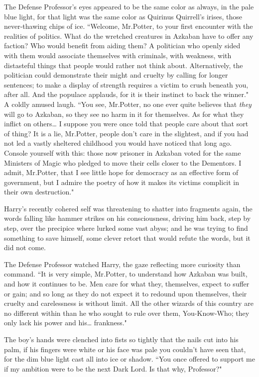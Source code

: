 The Defense Professor's eyes appeared to be the same color as always, in the pale blue light, for that light was the same color as Quirinus Quirrell's irises, those never-thawing chips of ice. ``Welcome, Mr.\?Potter, to your first encounter with the realities of politics. What do the wretched creatures in Azkaban have to offer any faction? Who would benefit from aiding them? A politician who openly sided with them would associate themselves with criminals, with weakness, with distasteful things that people would rather not think about. Alternatively, the politician could demonstrate their might and cruelty by calling for longer sentences; to make a display of strength requires a victim to crush beneath you, after all. And the populace applauds, for it is their instinct to back the winner." A coldly amused laugh. ``You see, Mr.\?Potter, no one ever quite believes that \emph{they} will go to Azkaban, so they see no harm in it for themselves. As for what they inflict on others{\ldots} I suppose you were once told that people care about that sort of thing? It is a lie, Mr.\?Potter, people don't care in the slightest, and if you had not led a vastly sheltered childhood you would have noticed that long ago. Console yourself with this: those now prisoner in Azkaban voted for the same Ministers of Magic who pledged to move their cells closer to the Dementors. I admit, Mr.\?Potter, that I see little hope for democracy as an effective form of government, but I admire the poetry of how it makes its victims complicit in their own destruction."

Harry's recently cohered self was threatening to shatter into fragments again, the words falling like hammer strikes on his consciousness, driving him back, step by step, over the precipice where lurked some vast abyss; and he was trying to find something to save himself, some clever retort that would refute the words, but it did not come.

The Defense Professor watched Harry, the gaze reflecting more curiosity than command. ``It is very simple, Mr.\?Potter, to understand how Azkaban was built, and how it continues to be. Men care for what they, themselves, expect to suffer or gain; and so long as they do not expect it to redound upon themselves, their cruelty and carelessness is without limit. All the other wizards of this country are no different within than he who sought to rule over them, You-Know-Who; they only lack his power and his{\ldots} frankness."

The boy's hands were clenched into fists so tightly that the nails cut into his palm, if his fingers were white or his face was pale you couldn't have seen that, for the dim blue light cast all into ice or shadow. ``You once offered to support me if my ambition were to be the next Dark Lord. Is that why, Professor?"

